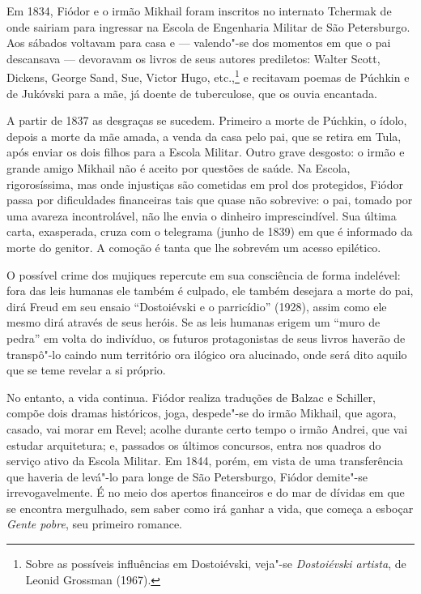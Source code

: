 Em 1834, Fiódor e o irmão Mikhail foram inscritos no internato Tchermak
de onde sairiam para ingressar na Escola de Engenharia Militar
de São Petersburgo. Aos sábados voltavam para casa e --- valendo"-se dos momentos em que o pai descansava --- devoravam os livros de seus autores prediletos: Walter Scott, Dickens, George Sand, Sue, Victor Hugo, etc.,\footnote{Sobre as possíveis influências em Dostoiévski, veja"-se \emph{Dostoiévski artista}, de Leonid Grossman (1967).} e recitavam poemas de Púchkin e
de Jukóvski para a mãe, já doente de tuberculose, que os ouvia
encantada.

A partir de 1837 as desgraças se sucedem. Primeiro a morte de
Púchkin, o ídolo, depois a morte da mãe amada, a venda da casa
pelo pai, que se retira em Tula, após enviar os dois filhos para
a Escola Militar. Outro grave desgosto: o irmão e grande amigo
Mikhail não é aceito por questões de saúde. Na Escola,
rigorosíssima, mas onde injustiças são cometidas em prol dos
protegidos, Fiódor passa por dificuldades financeiras tais que
quase não sobrevive: o pai, tomado por uma avareza incontrolável,
não lhe envia o dinheiro imprescindível. Sua última carta,
exasperada, cruza com o telegrama (junho de 1839) em que é
informado da morte do genitor. A comoção é tanta que lhe
sobrevém um acesso epilético.

O possível crime dos mujiques repercute em sua consciência de
forma indelével: fora das leis humanas ele também é culpado, ele
também desejara a morte do pai, dirá Freud em seu ensaio
``Dostoiévski e o parricídio'' (1928), assim como ele mesmo
dirá através de seus heróis. Se as leis humanas erigem um
``muro de pedra'' em volta do indivíduo, os futuros protagonistas
de seus livros haverão de transpô"-lo caindo num território ora
ilógico ora alucinado, onde será dito aquilo que se teme revelar
a si próprio.

No entanto, a vida continua. Fiódor realiza traduções de Balzac
e Schiller, compõe dois dramas históricos, joga, despede"-se do
irmão Mikhail, que agora, casado, vai morar em Revel; acolhe
durante certo tempo o irmão Andrei, que vai estudar arquitetura;
e, passados os últimos concursos, entra nos quadros do serviço
ativo da Escola Militar. Em 1844, porém, em vista de uma
transferência que haveria de levá"-lo para longe de São
Petersburgo, Fiódor demite"-se irrevogavelmente. É no meio dos apertos
financeiros e do mar de dívidas em que se encontra mergulhado, sem saber
como irá ganhar a vida, que começa a esboçar \emph{Gente
pobre}, seu primeiro romance.

